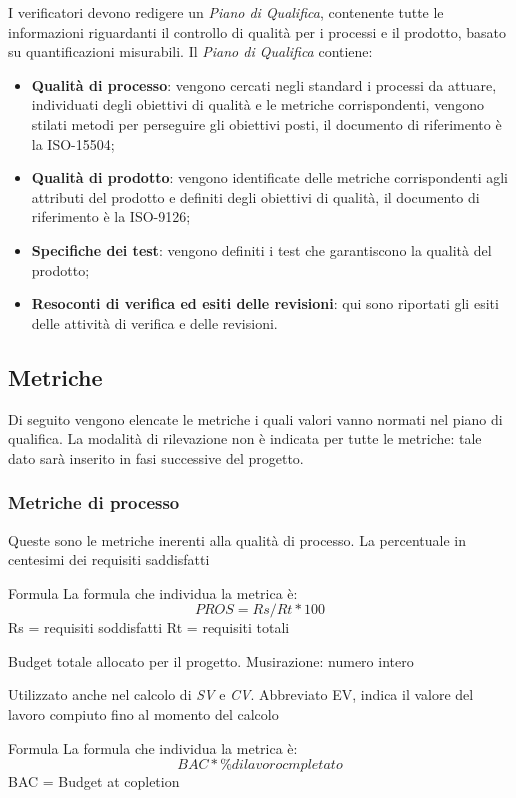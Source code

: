 			I verificatori devono redigere un \textit{Piano di Qualifica}, contenente tutte le informazioni riguardanti il controllo di qualità  per i processi e il prodotto, basato su quantificazioni misurabili. Il \textit{Piano di Qualifica} contiene:
			\begin{itemize}
			    \item \textbf{Qualità di processo}: vengono cercati negli standard i processi da attuare, individuati degli obiettivi di qualità e le metriche corrispondenti, vengono stilati metodi per perseguire gli obiettivi posti, il documento di riferimento è la ISO-15504;
			    \item \textbf{Qualità di prodotto}: vengono identificate delle metriche corrispondenti agli attributi del prodotto e definiti degli obiettivi di qualità, il documento di riferimento è la ISO-9126;
			    \item \textbf{Specifiche dei test}: vengono definiti i test che garantiscono la qualità del prodotto;
			    \item \textbf{Resoconti di verifica ed esiti delle revisioni}: qui sono riportati gli esiti delle attività di verifica e delle revisioni.
			\end{itemize}
			\subsection{Metriche}
			Di seguito vengono elencate le metriche i quali valori vanno normati nel piano di qualifica. 
La modalità di rilevazione non è indicata per tutte le metriche: tale dato sarà 
inserito in fasi successive del progetto.
\subsubsection{Metriche di processo}
Queste sono le metriche inerenti alla qualità di processo.
La percentuale in centesimi dei requisiti saddisfatti
\par{Formula}
La formula che individua la metrica è:
\begin{displaymath}
 PROS = Rs / Rt *100
\end{displaymath}
Rs = requisiti soddisfatti
Rt = requisiti totali


Budget totale allocato per il progetto.
Musirazione: numero intero


Utilizzato anche nel calcolo di \textit{SV} e \textit{CV}. Abbreviato EV, indica il valore del lavoro compiuto fino al momento del calcolo
\par{Formula}
La formula che individua la metrica è:
\begin{displaymath}
  BAC * \% di lavoro cmpletato
\end{displaymath}
BAC = Budget at copletion


